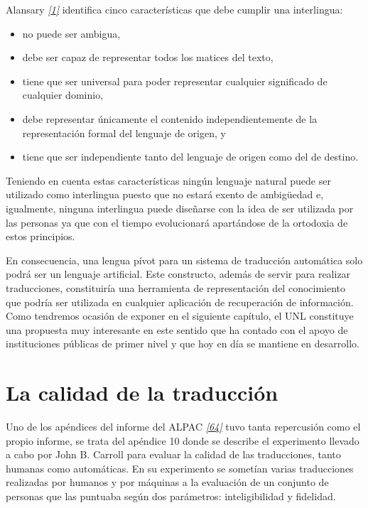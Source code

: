 \documentclass[a4paper,12pt,spanish]{book}
\begin{document}
Alansary \label{0.intro:id34}{\hyperref[zreferences:alansary2011]{\emph{{[}1{]}}}} identifica cinco características que debe cumplir una
interlingua:
\begin{itemize}
\item {} 
no puede ser ambigua,

\item {} 
debe ser capaz de representar todos los matices del texto,

\item {} 
tiene que ser universal para poder representar cualquier significado de cualquier
dominio,

\item {} 
debe representar únicamente el contenido independientemente de la representación
formal del lenguaje de origen, y

\item {} 
tiene que ser independiente tanto del lenguaje de origen como del de destino.

\end{itemize}

Teniendo en cuenta estas características ningún lenguaje natural puede ser utilizado
como interlingua puesto que no estará exento de ambigüedad e, igualmente, ninguna
interlingua puede diseñarse con la idea de ser utilizada por las personas ya que
con el tiempo evolucionará apartándose de la ortodoxia de estos principios.

En consecuencia, una lengua pívot para un sistema de traducción automática solo podrá ser
un lenguaje artificial. Este constructo, además de servir para realizar traducciones,
constituiría una herramienta de representación del conocimiento que podría ser utilizada
en cualquier aplicación de recuperación de información. Como tendremos ocasión de
exponer en el siguiente capítulo, el UNL constituye una propuesta muy interesante en este
sentido que ha contado con el apoyo de instituciones públicas de primer nivel y que
hoy en día se mantiene en desarrollo.


\section{La calidad de la traducción}
\label{0.intro:la-calidad-de-la-traduccion}
Uno de los apéndices del informe del ALPAC \label{0.intro:id35}{\hyperref[zreferences:pierce1966]{\emph{{[}64{]}}}} tuvo tanta
repercusión como el propio informe, se trata del apéndice 10 donde se describe
el experimento llevado a cabo por John B. Carroll para evaluar la calidad de las
traducciones, tanto humanas como automáticas. En su experimento se sometían
varias traducciones realizadas por humanos y por máquinas a la evaluación
de un conjunto de personas que las puntuaba según dos parámetros: inteligibilidad
y fidelidad.
\end{document}
